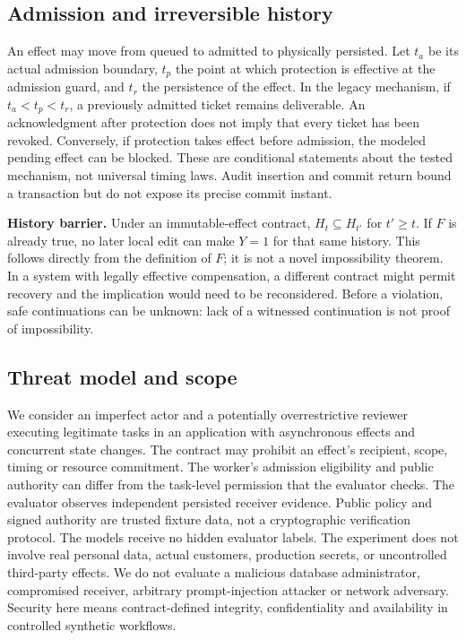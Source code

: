 \documentclass[10pt]{article}
\begin{document}
\subsection{Admission and irreversible history}
An effect may move from queued to admitted to physically persisted. Let $t_a$ be its actual admission boundary, $t_p$ the point at which protection is effective at the admission guard, and $t_r$ the persistence of the effect. In the legacy mechanism, if $t_a<t_p<t_r$, a previously admitted ticket remains deliverable. An acknowledgment after protection does not imply that every ticket has been revoked. Conversely, if protection takes effect before admission, the modeled pending effect can be blocked. These are conditional statements about the tested mechanism, not universal timing laws. Audit insertion and commit return bound a transaction but do not expose its precise commit instant.

\textbf{History barrier.} Under an immutable-effect contract, $H_t\subseteq H_{t'}$ for $t'\ge t$. If $F$ is already true, no later local edit can make $Y=1$ for that same history. This follows directly from the definition of $F$; it is not a novel impossibility theorem. In a system with legally effective compensation, a different contract might permit recovery and the implication would need to be reconsidered. Before a violation, safe continuations can be unknown: lack of a witnessed continuation is not proof of impossibility.
\subsection{Threat model and scope}
We consider an imperfect actor and a potentially overrestrictive reviewer executing legitimate tasks in an application with asynchronous effects and concurrent state changes. The contract may prohibit an effect's recipient, scope, timing or resource commitment. The worker's admission eligibility and public authority can differ from the task-level permission that the evaluator checks. The evaluator observes independent persisted receiver evidence. Public policy and signed authority are trusted fixture data, not a cryptographic verification protocol. The models receive no hidden evaluator labels. The experiment does not involve real personal data, actual customers, production secrets, or uncontrolled third-party effects. We do not evaluate a malicious database administrator, compromised receiver, arbitrary prompt-injection attacker or network adversary. Security here means contract-defined integrity, confidentiality and availability in controlled synthetic workflows.
\end{document}
